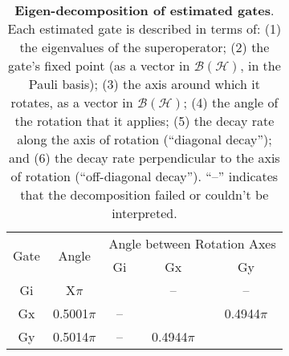 {\begin{table}[h]
\begin{center}
\vspace{2em}
\begin{tabular}[l]{|c|c|c|c|c|}
\hline
\multirow{2}{*}{Gate} & \multirow{2}{*}{Angle} & \multicolumn{3}{c|}{Angle between Rotation Axes} \\ \cline{3-5}
 & & Gi & Gx & Gy \\ \hline
Gi & X$\pi$ &  & -- & -- \\ \hline
Gx & 0.5001$\pi$ & -- &  & 0.4944$\pi$ \\ \hline
Gy & 0.5014$\pi$ & -- & 0.4944$\pi$ &  \\ \hline
\end{tabular}

\caption{\textbf{Eigen-decomposition of estimated gates}.  Each estimated gate is described in terms of: (1) the eigenvalues of the superoperator; (2) the gate's fixed point (as a vector in $\mathcal{B}(\mathcal{H})$, in the Pauli basis); (3)  the axis around which it rotates, as a vector in $\mathcal{B}(\mathcal{H})$; (4) the angle of the rotation that it applies; (5) the decay rate along the axis of rotation (``diagonal decay''); and (6) the decay rate perpendicular to the axis of rotation (``off-diagonal decay'').  ``--'' indicates that the decomposition failed or couldn't be interpreted. \label{bestTargetGatesetDecompTable}}
\end{center}
\end{table}


}

